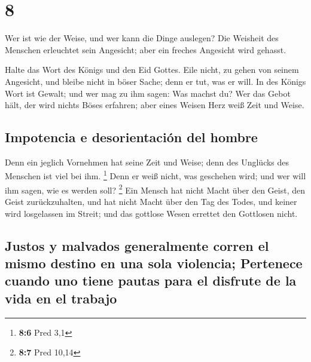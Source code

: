 \hypertarget{section-7}{%
\section{8}\label{section-7}}

 Wer ist wie der Weise, und wer kann die Dinge auslegen?
Die Weisheit des Menschen erleuchtet sein Angesicht; aber ein freches
Angesicht wird gehasst.

 Halte das Wort des Königs und den Eid Gottes.
 Eile nicht, zu gehen von seinem Angesicht, und bleibe
nicht in böser Sache; denn er tut, was er will.  In des
Königs Wort ist Gewalt; und wer mag zu ihm sagen: Was machst du?
 Wer das Gebot hält, der wird nichts Böses erfahren; aber
eines Weisen Herz weiß Zeit und Weise.

\hypertarget{impotencia-e-desorientaciuxf3n-del-hombre}{%
\subsection{Impotencia e desorientación del
hombre}\label{impotencia-e-desorientaciuxf3n-del-hombre}}

 Denn ein jeglich Vornehmen hat seine Zeit und Weise; denn
des Unglücks des Menschen ist viel bei ihm. \footnote{\textbf{8:6} Pred
  3,1}  Denn er weiß nicht, was geschehen wird; und wer
will ihm sagen, wie es werden soll? \footnote{\textbf{8:7} Pred 10,14}
 Ein Mensch hat nicht Macht über den Geist, den Geist
zurückzuhalten, und hat nicht Macht über den Tag des Todes, und keiner
wird losgelassen im Streit; und das gottlose Wesen errettet den
Gottlosen nicht.

\hypertarget{justos-y-malvados-generalmente-corren-el-mismo-destino-en-una-sola-violencia-pertenece-cuando-uno-tiene-pautas-para-el-disfrute-de-la-vida-en-el-trabajo}{%
\subsection{Justos y malvados generalmente corren el mismo destino en
una sola violencia; Pertenece cuando uno tiene pautas para el disfrute
de la vida en el
trabajo}\label{justos-y-malvados-generalmente-corren-el-mismo-destino-en-una-sola-violencia-pertenece-cuando-uno-tiene-pautas-para-el-disfrute-de-la-vida-en-el-trabajo}}

